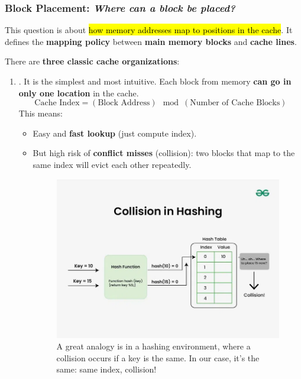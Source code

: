 \subsubsection{Block Placement: \emph{Where can a block be placed?}}\label{subsubsection: Block placement}

This question is about \hl{how memory addresses map to positions in the cache}. It defines the \textbf{mapping policy} between \textbf{main memory blocks} and \textbf{cache lines}.

\highspace
There are \textbf{three classic cache organizations}:
\begin{enumerate}
    \item {}. It is the simplest and most intuitive. Each block from memory \textbf{can go in only one location} in the cache.
    \begin{equation}
        \text{Cache Index} = \left(\text{Block Address}\right) \mod \left(\text{Number of Cache Blocks}\right)
    \end{equation}
    This means:
    \begin{itemize}
        \item[\textcolor{Green3}{\faIcon{check-circle}}] Easy and \textbf{fast lookup} (just compute index).
        \item[\textcolor{Red2}{\faIcon{times-circle}}] But high risk of \textbf{conflict misses} (collision): two blocks that map to the same index will evict each other repeatedly.
        \begin{figure}[!htp]
            \centering
            \includegraphics[width=\textwidth]{img/collision-in-hashing-768.png}
            \caption{A great analogy is in a hashing environment, where a collision occurs if a key is the same. In our case, it's the same: same index, collision!\cite{GFG_CollisionResolutionImage_2025}}

\end{figure}
\end{itemize}
\end{enumerate}
